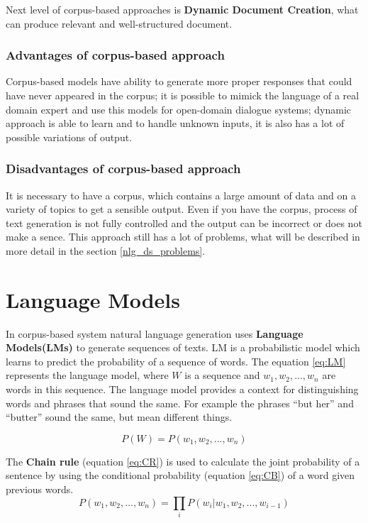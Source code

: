 Next level of corpus-based approaches is \textbf{Dynamic Document Creation}, what can produce relevant and well-structured document. 

\subsubsection{Advantages of corpus-based approach}
Corpus-based models have ability to generate more proper responses that could have never appeared in the corpus; it is possible to mimick the language of a real domain expert and use this models for open-domain dialogue systems; dynamic approach is able to learn and to handle unknown inputs, it is also has a lot of possible variations of output.

\subsubsection{Disadvantages of corpus-based approach}
It is necessary to have a corpus, which contains a large amount of data and on a variety of topics to get a sensible output. Even if you have the corpus, process of text generation is not fully controlled and the output can be incorrect or does not make a sence. This approach still has a lot of problems, what will be described in more detail in the section \ref{nlg_ds_problems}. 

\section{Language Models}
In corpus-based system natural language generation uses \textbf{Language Models(LMs)} to generate sequences of texts. LM is a probabilistic model which learns to predict the probability of a sequence of words. The equation \ref{eq:LM} represents the language model, where $W$ is a sequence and $w_1, w_2, ..., w_n$ are words in this sequence. The language model provides a context for distinguishing words and phrases that sound the same. For example the phrases ``but her'' and  ``butter'' sound the same, but mean different things.

\begin{equation} \label{eq:LM}
P(W) = P(w_1, w_2, ..., w_n)
\end{equation}

The \textbf{Chain rule} (equation \ref{eq:CR}) is used to calculate the joint probability of a sentence by using the conditional probability (equation \ref{eq:CB}) of a word given previous words. 
\begin{equation} \label{eq:CR}
P(w_1, w_2,..., w_n) = \prod_{i}P(w_i|w_1, w_2,...,w_{i-1})
\end{equation}

